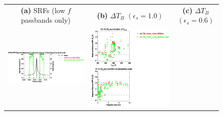 \begin{figure}[H]
  \centering
  \begin{tabular}{c c c}
    \textsf{\textbf{(a)} SRFs (low $f$ passbands only)} &
    \textsf{\textbf{(b)} $\Delta T_B$ $(\epsilon_s = 1.0)$} &
    \textsf{\textbf{(c)} $\Delta T_B$ $(\epsilon_s = 0.6)$} \\
    \includegraphics[bb=80 400 280 558,clip,scale=0.85]{graphics/srf/Rset/atms_npp.ch12.osrf.eps} &
    \includegraphics[bb=85 400 260 558,clip,scale=0.85]{graphics/dtb/Rset/e1.0_r0.0/atms_npp.ch12.dTb.eps} & 

\end{tabular}
\end{figure}
